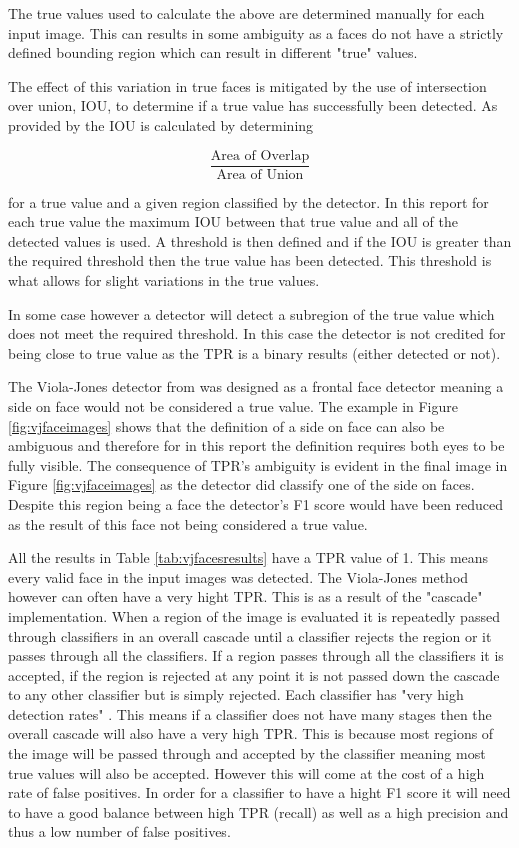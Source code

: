 \documentclass{article}
\begin{document}
\begin{multicols}{2}
The true values used to calculate the above are determined manually for each
input image. This can results in some ambiguity as a faces do not have a
strictly defined bounding region which can result in different "true" values. 

The effect of this variation in true faces is mitigated by the use of intersection over union, IOU, to determine if a true value has successfully been detected. As provided by \cite{iou} the IOU is calculated by determining 

\[ \frac{\mbox{Area of Overlap}}{\mbox{Area of Union}}\] 

for a true value and a given region classified by the detector. In this report 
for each true value the maximum IOU between that true value and all of
the detected values is used. A threshold is then defined and if the IOU is greater
than the required threshold then the true value has been detected. This threshold
is what allows for slight variations in the true values. 

In some case however a detector will detect a subregion of the true value which
does not meet the required threshold. In this case the detector is not credited for
being close to true value as the TPR is a binary results (either detected or
not).

The Viola-Jones detector from \cite{vj} was designed as a frontal face detector
meaning a side on face would not be considered a true value. The example in
Figure \ref{fig:vjfaceimages} shows that the definition of a side on face can
also be ambiguous and therefore for in this report the definition requires both
eyes to be fully visible. The consequence of TPR's ambiguity is evident in the
final image in Figure \ref{fig:vjfaceimages} as the detector did classify one of the
side on faces. Despite this region being a face the detector's F1 score would have been
reduced as the result of this face not being considered a true value.

All the results in Table \ref{tab:vjfacesresults} have a TPR value of 1. This
means every valid face in the input images was detected. The Viola-Jones
method however can often have a very hight TPR. This is as a result of the
"cascade" \cite{vj} implementation. When a region of the image is evaluated it
is repeatedly passed through classifiers in an overall cascade until a
classifier rejects the region or it passes through all the classifiers. If a
region passes through all the classifiers it is accepted, if the region is
rejected at any point it is not passed down the cascade to any other classifier
but is simply rejected. Each classifier has "very high detection rates"
\cite{vj}. This means if a classifier does not have many stages then the
overall cascade will also have a very high TPR. This is because most
regions of the image will be passed through and accepted by the classifier
meaning most true values will also be accepted. However this will come at the
cost of a high rate of false positives. In order for a classifier to have a
hight F1 score it will need to have a good balance between high TPR (recall) as well as
a high precision and thus a low number of false positives.



\end{multicols}
\end{document}
